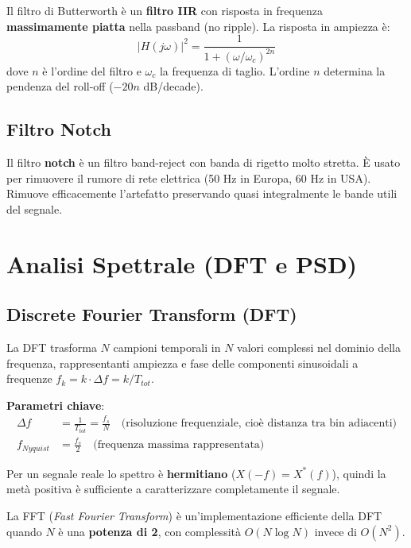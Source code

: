 Il filtro di Butterworth è un \textbf{filtro IIR} con risposta in frequenza \textbf{massimamente piatta} nella passband (no ripple). La risposta in ampiezza è:
\[
|H(j\omega)|^2 = \frac{1}{1 + (\omega/\omega_c)^{2n}}
\]
dove $n$ è l'ordine del filtro e $\omega_c$ la frequenza di taglio. L'ordine $n$ determina la pendenza del roll-off ($-20n$ dB/decade).

\subsection{Filtro Notch}

Il filtro \textbf{notch} è un filtro band-reject con banda di rigetto molto stretta. È usato per rimuovere il rumore di rete elettrica (50 Hz in Europa, 60 Hz in USA). Rimuove efficacemente l'artefatto preservando quasi integralmente le bande utili del segnale.

\section{Analisi Spettrale (DFT e PSD)}

\subsection{Discrete Fourier Transform (DFT)}

\begin{definizione}[-- DFT]
La DFT trasforma $N$ campioni temporali in $N$ valori complessi nel dominio della frequenza, rappresentanti ampiezza e fase delle componenti sinusoidali a frequenze $f_k = k \cdot \Delta f = k/T_{tot}$.
\end{definizione}

\textbf{Parametri chiave}:
\begin{align}
\Delta f &= \frac{1}{T_{tot}} = \frac{f_s}{N} \quad \text{(risoluzione frequenziale, cioè distanza tra bin adiacenti)} \\
f_{Nyquist} &= \frac{f_s}{2} \quad \text{(frequenza massima rappresentata)}
\end{align}

Per un segnale reale lo spettro è \textbf{hermitiano} ($X(-f) = X^*(f)$), quindi la metà positiva è sufficiente a caratterizzare completamente il segnale.

La FFT (\textit{Fast Fourier Transform}) è un'implementazione efficiente della DFT quando $N$ è una \textbf{potenza di 2}, con complessità $O(N \log N)$ invece di $O(N^2)$.

